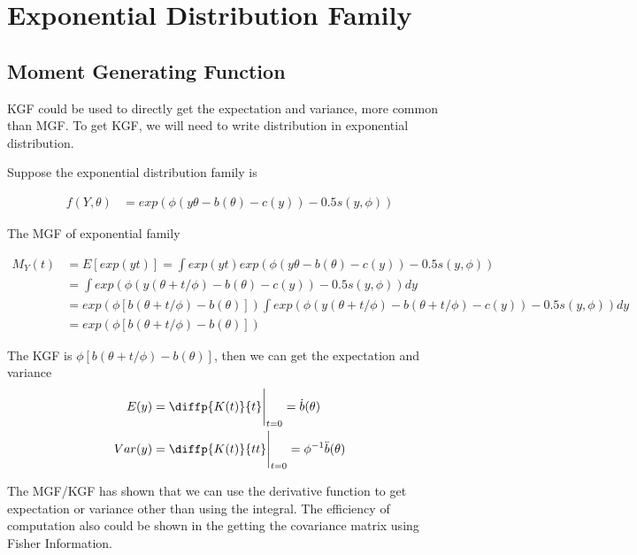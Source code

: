 
 \section{Exponential Distribution Family}


\subsection{Moment Generating Function}

KGF could be used to directly get the expectation and variance, more common than MGF. To get KGF, we will need to write distribution in exponential distribution.

Suppose the exponential distribution family is 

\begin{align*}
	f(Y, \theta) &= exp\left( \phi (y \theta - b(\theta) -c(y)) - 0.5s(y, \phi) \right)
\end{align*}

The MGF of exponential family

\begin{align*}
	M_Y(t) &= E[ exp(yt)] = \int exp(yt) exp\left( \phi (y \theta - b(\theta) -c(y)) - 0.5s(y, \phi) \right) \\
	&= \int  exp \left( \phi (y (\theta + t/\phi) - b(\theta) -c(y)) - 0.5s(y, \phi) \right) dy\\
	&= exp(\phi [b(\theta + t/\phi) - b(\theta)]) \int  exp\left( \phi (y (\theta + t/\phi) - b(\theta + t/\phi) -c(y)) - 0.5s(y, \phi) \right) dy\\
	&= exp(\phi [b(\theta + t/\phi) - b(\theta)]) 
\end{align*}

The KGF is $\phi [b(\theta + t/\phi) - b(\theta)]$, then we can get the expectation and variance
\begin{align*}
	E(y) &= \diffp{K(t)}{t} \Bigg |_{t=0} = \dot{b}(\theta)\\
	Var(y) &= \diffp{K(t)}{t t} \Bigg |_{t=0} = \phi^{-1} \ddot{b}(\theta)
\end{align*}

The MGF/KGF has shown that we can use the derivative function to get expectation or variance other than using the integral. The efficiency of computation also could be shown in the getting the covariance matrix using Fisher Information.


 
